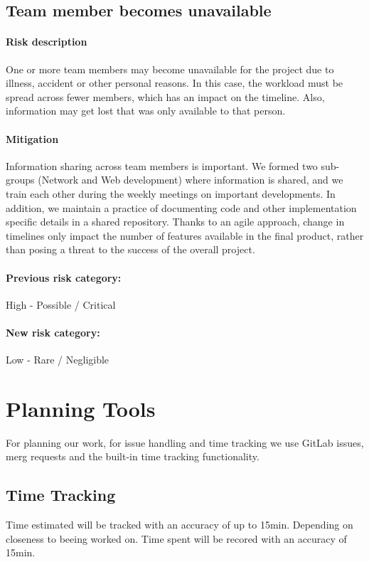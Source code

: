 \subsection{Team member becomes unavailable}
\paragraph{Risk description} One or more team members may become unavailable for the project due to illness, accident or other personal reasons. In this case, the workload must be spread across fewer members, which has an impact on the timeline. Also, information may get lost that was only available to that person.
\paragraph{Mitigation} Information sharing across team members is important. We formed two sub-groups (Network and Web development) where information is shared, and we train each other during the weekly meetings on important developments. In addition, we maintain a practice of documenting code and other implementation specific details in a shared repository. Thanks to an agile approach, change in timelines only impact the number of features available in the final product, rather than posing a threat to the success of the overall project.
\paragraph{Previous risk category:} High - Possible / Critical
\paragraph{New risk category:} Low - Rare / Negligible

\section{Planning Tools}
For planning our work, for issue handling and time tracking we use GitLab issues, merg requests and the built-in time tracking functionality.

\subsection{Time Tracking}
Time estimated will be tracked with an accuracy of up to 15min. Depending on closeness to beeing worked on.
Time spent will be recored with an accuracy of 15min.
